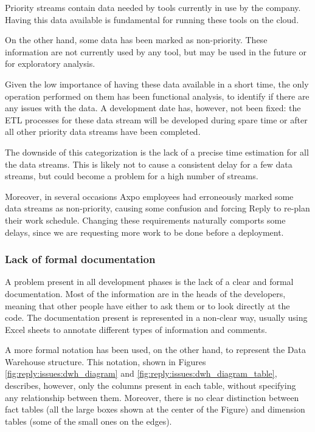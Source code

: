     Priority streams contain data needed by tools currently in use by the company.
    Having this data available is fundamental for running these tools on the cloud.
    
    On the other hand, some data has been marked as non-priority.
    These information are not currently used by any tool, but may be used in the future or for exploratory analysis.
    
    Given the low importance of having these data available in a short time, the only operation performed on them has been functional analysis, to identify if there are any issues with the data.
    A development date has, however, not been fixed: the ETL processes for these data stream will be developed during spare time or after all other priority data streams have been completed.
    
    The downside of this categorization is the lack of a precise time estimation for all the data streams.
    This is likely not to cause a consistent delay for a few data streams, but could become a problem for a high number of streams.
    
    Moreover, in several occasions Axpo employees had erroneously marked some data streams as non-priority, causing some confusion and forcing Reply to re-plan their work schedule.
    Changing these requirements naturally comports some delays, since we are requesting more work to be done before a deployment.
    
\subsubsection{Lack of formal documentation}
    A problem present in all development phases is the lack of a clear and formal documentation.
    Most of the information are in the heads of the developers, meaning that other people have either to ask them or to look directly at the code.
    The documentation present is represented in a non-clear way, usually using Excel sheets to annotate different types of information and comments.
    
    A more formal notation has been used, on the other hand, to represent the Data Warehouse structure.
    This notation, shown in Figures \ref{fig:reply:issues:dwh_diagram} and \ref{fig:reply:issues:dwh_diagram_table}, describes, however, only the columns present in each table, without specifying any relationship between them.
    Moreover, there is no clear distinction between fact tables (all the large boxes shown at the center of the Figure) and dimension tables (some of the small ones on the edges).
    
